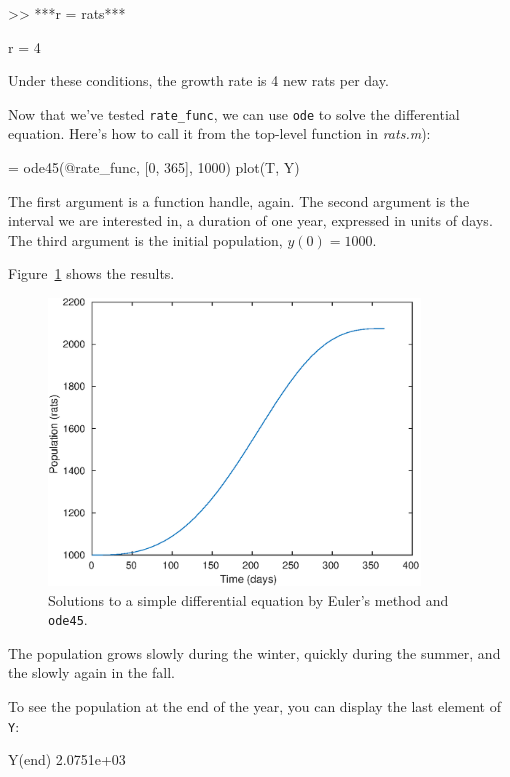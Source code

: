 \begin{code}
>> ***r = rats***

r = 4
\end{code}

Under these conditions, the growth rate is 4 new rats per day. 

Now that we've tested \verb"rate_func", we can use {\tt ode} to solve the differential equation.
Here's how to call it from the top-level function in {\em rats.m}):

\begin{code}
[T, Y] = ode45(@rate_func, [0, 365], 1000)
plot(T, Y)
\end{code}

The first argument is a function handle, again.  The second argument is the interval we are interested in, a duration of one year, expressed in units of days.
The third argument is the initial population, $y(0) = 1000$.


Figure~\ref{fig:rats} shows the results. 

\begin{figure}[ht]
\centerline{\includegraphics[height=3in]{book/figs/rats.eps}}
\caption{Solutions to a simple differential equation by Euler's method and {\tt ode45}.}
\label{fig:rats}
\end{figure}

The population grows slowly during the winter, quickly during the summer, and the slowly again in the fall.

To see the population at the end of the year, you can display the last element of {\tt Y}:

\begin{code}
Y(end)
2.0751e+03
\end{code}


